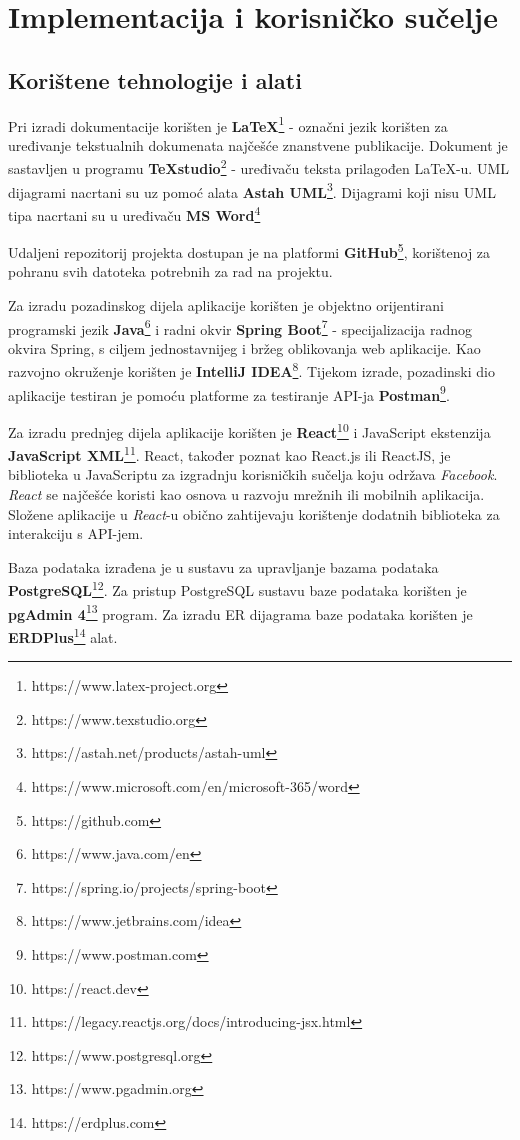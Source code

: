 \chapter{Implementacija i korisničko sučelje}
		
		
		\section{Korištene tehnologije i alati}
			
			\indent Pri izradi dokumentacije korišten je \textbf{LaTeX}\footnote{https://www.latex-project.org} - označni jezik korišten za uređivanje tekstualnih dokumenata najčešće znanstvene publikacije. Dokument je sastavljen u programu \textbf{TeXstudio}\footnote{https://www.texstudio.org} - uređivaču teksta prilagođen LaTeX-u. UML dijagrami nacrtani su uz pomoć alata \textbf{Astah UML}\footnote{https://astah.net/products/astah-uml}. Dijagrami koji nisu UML tipa nacrtani su u uređivaču \textbf{MS Word}\footnote{https://www.microsoft.com/en/microsoft-365/word}
			
			Udaljeni repozitorij projekta dostupan je na platformi \textbf{GitHub}\footnote{https://github.com}, korištenoj za pohranu svih datoteka potrebnih za rad na projektu.
			
			Za izradu pozadinskog dijela aplikacije korišten je objektno orijentirani programski jezik \textbf{Java}\footnote{https://www.java.com/en} i radni okvir \textbf{Spring Boot}\footnote{https://spring.io/projects/spring-boot} - specijalizacija radnog okvira Spring, s ciljem jednostavnijeg i bržeg oblikovanja web aplikacije. Kao razvojno okruženje korišten je \textbf{IntelliJ IDEA}\footnote{https://www.jetbrains.com/idea}. Tijekom izrade, pozadinski dio aplikacije testiran je pomoću platforme za testiranje API-ja \textbf{Postman}\footnote{https://www.postman.com}.
			
			Za izradu prednjeg dijela aplikacije korišten je \textbf{React}\footnote{https://react.dev} i JavaScript ekstenzija \textbf{JavaScript XML}\footnote{https://legacy.reactjs.org/docs/introducing-jsx.html}. React, također poznat kao React.js ili ReactJS, je biblioteka u JavaScriptu za izgradnju korisničkih sučelja koju održava \textit{Facebook}. \textit{React} se najčešće koristi kao osnova u razvoju mrežnih ili mobilnih aplikacija. Složene aplikacije u \textit{React}-u obično zahtijevaju korištenje dodatnih biblioteka za interakciju s API-jem.
			
			Baza podataka izrađena je u sustavu za upravljanje bazama podataka \textbf{PostgreSQL}\footnote{https://www.postgresql.org}. Za pristup PostgreSQL sustavu baze podataka korišten je \textbf{pgAdmin 4}\footnote{https://www.pgadmin.org} program. Za izradu ER dijagrama baze podataka korišten je \textbf{ERDPlus}\footnote{https://erdplus.com} alat.
			
